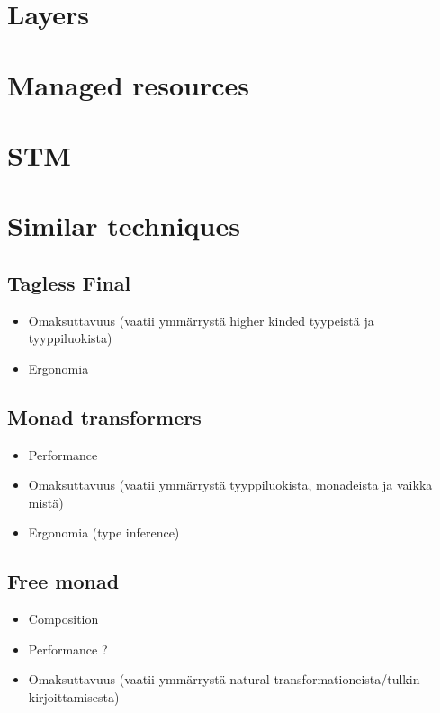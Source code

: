 \section{Layers}

\section{Managed resources}

\section{STM}

\section{Similar techniques}
\subsection{Tagless Final}
\begin{itemize}
    \item Omaksuttavuus (vaatii ymmärrystä higher kinded tyypeistä ja tyyppiluokista)
    \item Ergonomia
\end{itemize}

\subsection{Monad transformers}
\begin{itemize}
    \item Performance
    \item Omaksuttavuus (vaatii ymmärrystä tyyppiluokista, monadeista ja vaikka mistä)
    \item Ergonomia (type inference)
\end{itemize}

\subsection{Free monad}
\begin{itemize}
    \item Composition
    \item Performance ?
    \item Omaksuttavuus (vaatii ymmärrystä natural transformationeista/tulkin kirjoittamisesta)
\end{itemize}


